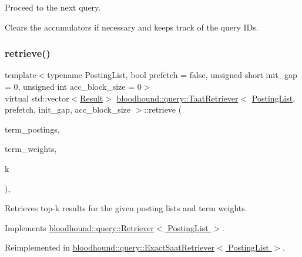 Proceed to the next query.

Clears the accumulators if necessary and keeps track of the query I\+Ds. \mbox{\label{classbloodhound_1_1query_1_1TaatRetriever_a58284f19458689021a083c07ea627485}} 
\subsubsection{\texorpdfstring{retrieve()}{retrieve()}}
{\footnotesize\ttfamily template$<$typename Posting\+List, bool prefetch = false, unsigned short init\+\_\+gap = 0, unsigned int acc\+\_\+block\+\_\+size = 0$>$ \\
virtual std\+::vector$<$\hyperlink{structbloodhound_1_1query_1_1Result}{Result}$>$ \hyperlink{classbloodhound_1_1query_1_1TaatRetriever}{bloodhound\+::query\+::\+Taat\+Retriever}$<$ \hyperlink{classbloodhound_1_1PostingList}{Posting\+List}, prefetch, init\+\_\+gap, acc\+\_\+block\+\_\+size $>$\+::retrieve (\begin{DoxyParamCaption}\item[{const std\+::vector$<$ \hyperlink{classbloodhound_1_1PostingList}{Posting\+List} $>$ \&}]{term\+\_\+postings,  }\item[{const std\+::vector$<$ \hyperlink{structbloodhound_1_1Score}{Score} $>$ \&}]{term\+\_\+weights,  }\item[{std\+::size\+\_\+t}]{k }\end{DoxyParamCaption})\hspace{0.3cm}{\ttfamily [inline]}, {\ttfamily [virtual]}}



Retrieves top-\/k results for the given posting lists and term weights. 



Implements \hyperlink{classbloodhound_1_1query_1_1Retriever_ae3c6a4628c5580e620c213b3dcd47c2b}{bloodhound\+::query\+::\+Retriever$<$ Posting\+List $>$}.



Reimplemented in \hyperlink{classbloodhound_1_1query_1_1ExactSaatRetriever_aced2763cc2a4c12838fef4a20759049e}{bloodhound\+::query\+::\+Exact\+Saat\+Retriever$<$ Posting\+List $>$}.

\mbox{\label{classbloodhound_1_1query_1_1TaatRetriever_ae1c8d9643ca85ba7dba32325538e30b5}} 
